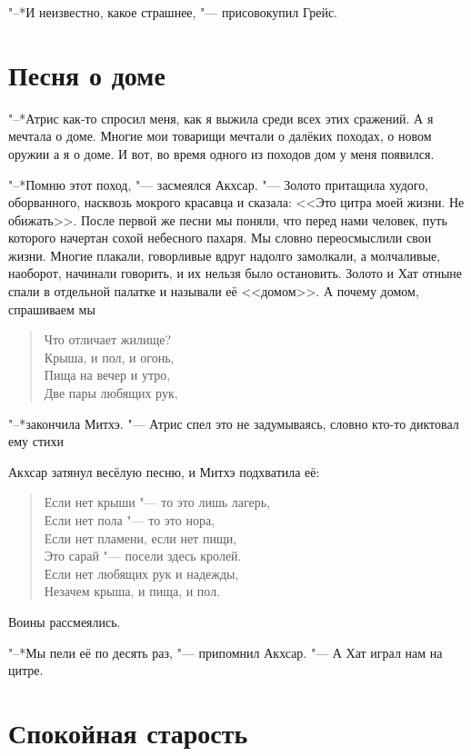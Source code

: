 \documentclass[a4paper,10pt,fleqn]{book}
\newcommand{\ldotst}{\so{...}\xspace}
\newcommand{\ldotsq}{\so{?\hbox{\hspace{-.212em}}..}\xspace}
\begin{document}
"--*И неизвестно, какое страшнее, "--- присовокупил Грейс.

\section{Песня о доме}

"--*Атрис как-то спросил меня, как я выжила среди всех этих сражений.
А я мечтала о доме.
Многие мои товарищи мечтали о далёких походах, о новом оружии\ldotst а я о доме.
И вот, во время одного из походов дом у меня появился.

"--*Помню этот поход, "--- засмеялся Акхсар.
"--- Золото притащила худого, оборванного, насквозь мокрого красавца и сказала: <<Это цитра моей жизни.
Не обижать>>.
После первой же песни мы поняли, что перед нами человек, путь которого начертан сохой небесного пахаря.
Мы словно переосмыслили свои жизни.
Многие плакали, говорливые вдруг надолго замолкали, а молчаливые, наоборот, начинали говорить, и их нельзя было остановить.
Золото и Хат отныне спали в отдельной палатке и называли её <<домом>>.
А почему домом, спрашиваем мы\ldotsq

\begin{verse}
Что отличает жилище?\\
Крыша, и пол, и огонь,\\
Пища на вечер и утро,\\
Две пары любящих рук,\\
\end{verse}

"--*закончила Митхэ.
"--- Атрис спел это не задумываясь, словно кто-то диктовал ему стихи\ldotst

Акхсар затянул весёлую песню, и Митхэ подхватила её:

\begin{verse}
Если нет крыши "--- то это лишь лагерь,\\
Если нет пола "--- то это нора,\\
Если нет пламени, если нет пищи,\\
Это сарай "--- посели здесь кролей.\\
Если нет любящих рук и надежды,\\
Незачем крыша, и пища, и пол.\\
\end{verse}

Воины рассмеялись.

"--*Мы пели её по десять раз, "--- припомнил Акхсар.
"--- А Хат играл нам на цитре.

\section{Спокойная старость}
\end{document}
